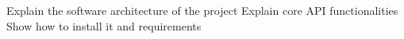 Explain the software architecture of the project 
Explain core API functionalities
Show how to install it and requirements

